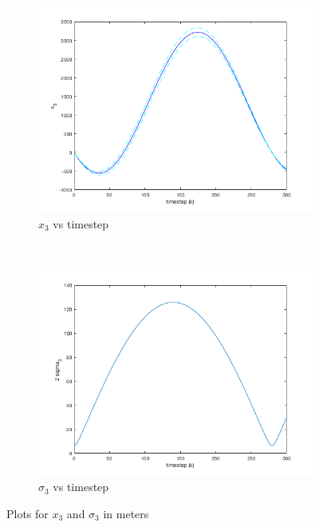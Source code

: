 \documentclass[11pt]{article}
\begin{document}
\begin{figure}
\centering
\begin{subfigure}[b]{.45\textwidth}
	\centering
	\includegraphics[width=\textwidth]{p1_plt5.png}
	\caption{$x_3$ vs timestep}
	\label{x3}
\end{subfigure}
~
\begin{subfigure}[b]{.5\textwidth}
	\centering
	\includegraphics[width=\textwidth]{p1_plt6.png}
	\caption{$\sigma_3$ vs timestep}
	\label{sigma3}
\end{subfigure}
\caption{Plots for $x_3$ and $\sigma_3$ in meters}
\label{x3plots}
\end{figure}
\end{document}
